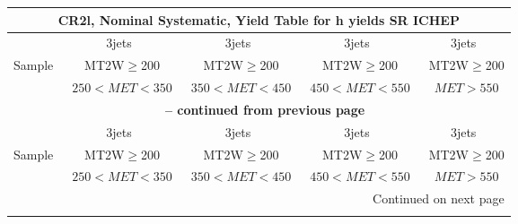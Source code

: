 \documentclass{article}
\begin{document}
\begin{longtable}{|l|c|c|c|c|} 
 
\multicolumn{5}{c}{ CR2l, Nominal Systematic, Yield Table for h yields SR ICHEP }\\* \hline 
  & 3jets  & 3jets  & 3jets  & 3jets \\* 
Sample  & ~MT2W$\ge$200  & ~MT2W$\ge$200  & ~MT2W$\ge$200  & ~MT2W$\ge$200 \\* 
  & ~$250<MET<350$  & ~$350<MET<450$  & ~$450<MET<550$  & ~$MET>550$ \\* 
\hline \hline 
\endfirsthead 
 
\multicolumn{5}{c}{{\bfseries \tablename\ \thetable{} -- continued from previous page}}\\* \hline 
  & 3jets  & 3jets  & 3jets  & 3jets \\* 
Sample  & ~MT2W$\ge$200  & ~MT2W$\ge$200  & ~MT2W$\ge$200  & ~MT2W$\ge$200 \\* 
  & ~$250<MET<350$  & ~$350<MET<450$  & ~$450<MET<550$  & ~$MET>550$ \\* 
\hline \hline 
\endhead 
 
\multicolumn{5}{|r|}{{Continued on next page}}\\* \hline 
\endfoot 
 
 
\endlastfoot 
 

\end{longtable}
\end{document}
